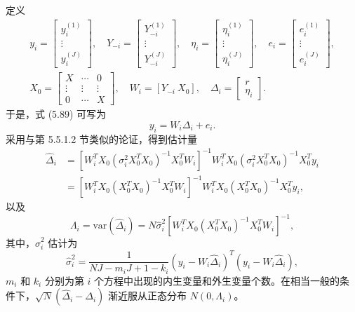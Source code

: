 定义
\begin{equation}
\begin{gathered}
y_i=\begin{bmatrix}y_i^{(1)}\\\vdots\\y_i^{(J)}\end{bmatrix},\quad
Y_{-i}=\begin{bmatrix}Y_{-i}^{(1)}\\\vdots\\Y_{-i}^{(J)}\end{bmatrix},\quad
\eta_i=\begin{bmatrix}\eta_i^{(1)}\\\vdots\\\eta_i^{(J)}\end{bmatrix},\quad
e_i=\begin{bmatrix}e_i^{(1)}\\\vdots\\e_i^{(J)}\end{bmatrix},\\[5pt]
X_0=\begin{bmatrix}X&\cdots&0\\\vdots&\vdots&\vdots\\0&\cdots&X\end{bmatrix},\quad
W_i=[Y_{-i}\ X_0],\quad
\Delta_i=\begin{bmatrix}r\\\eta_i\end{bmatrix}.
\end{gathered}
\tag{5.90}
\end{equation}
于是，式 (5.89) 可写为
\begin{equation}
y_i=W_i\Delta_i+e_i.
\tag{5.91}
\end{equation}
采用与第 5.5.1.2 节类似的论证，得到估计量
\begin{equation}
\begin{aligned}
\widehat\Delta_i
&=[W_i^TX_0(\sigma_i^2X_0^TX_0)^{-1}X_0^TW_i]^{-1}
W_i^TX_0(\sigma_i^2X_0^TX_0)^{-1}X_0^Ty_i\\
&=[W_i^TX_0(X_0^TX_0)^{-1}X_0^TW_i]^{-1}
W_i^TX_0(X_0^TX_0)^{-1}X_0^Ty_i,
\end{aligned}
\tag{5.92}
\end{equation}
以及
\begin{equation}
\Lambda_i=\mathrm{var}(\widehat\Delta_i)
=N\widehat\sigma_i^2[W_i^TX_0(X_0^TX_0)^{-1}X_0^TW_i]^{-1},
\tag{5.93}
\end{equation}
其中，$\widehat\sigma_i^2$ 估计为
\begin{equation}
\widehat\sigma_i^2=\frac1{NJ-m_iJ+1-k_i}
(y_i-W_i\widehat\Delta_i)^T(y_i-W_i\widehat\Delta_i),
\tag{5.94}
\end{equation}
$m_i$ 和 $k_i$ 分别为第 $i$ 个方程中出现的内生变量和外生变量个数。在相当一般的条件下，$\sqrt N(\widehat\Delta_i-\Delta_i)$ 渐近服从正态分布 $N(0,\Lambda_i)$。


